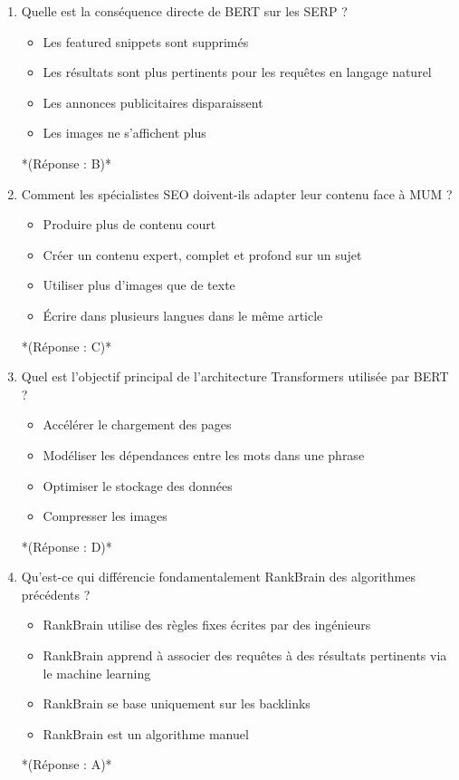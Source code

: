 \documentclass[12pt,a4paper,twoside]{report}
\begin{document}
\begin{enumerate}
\item Quelle est la conséquence directe de BERT sur les SERP ?
\begin{itemize}
\item[A)] Les featured snippets sont supprimés
\item[B)] Les résultats sont plus pertinents pour les requêtes en langage naturel
\item[C)] Les annonces publicitaires disparaissent
\item[D)] Les images ne s'affichent plus
\end{itemize}
*(Réponse : B)*

\item Comment les spécialistes SEO doivent-ils adapter leur contenu face à MUM ?
\begin{itemize}
\item[A)] Produire plus de contenu court
\item[B)] Créer un contenu expert, complet et profond sur un sujet
\item[C)] Utiliser plus d'images que de texte
\item[D)] Écrire dans plusieurs langues dans le même article
\end{itemize}
*(Réponse : C)*

\item Quel est l'objectif principal de l'architecture Transformers utilisée par BERT ?
\begin{itemize}
\item[A)] Accélérer le chargement des pages
\item[B)] Modéliser les dépendances entre les mots dans une phrase
\item[C)] Optimiser le stockage des données
\item[D)] Compresser les images
\end{itemize}
*(Réponse : D)*

\item Qu'est-ce qui différencie fondamentalement RankBrain des algorithmes précédents ?
\begin{itemize}
\item[A)] RankBrain utilise des règles fixes écrites par des ingénieurs
\item[B)] RankBrain apprend à associer des requêtes à des résultats pertinents via le machine learning
\item[C)] RankBrain se base uniquement sur les backlinks
\item[D)] RankBrain est un algorithme manuel
\end{itemize}
*(Réponse : A)*


\end{enumerate}
\end{document}

